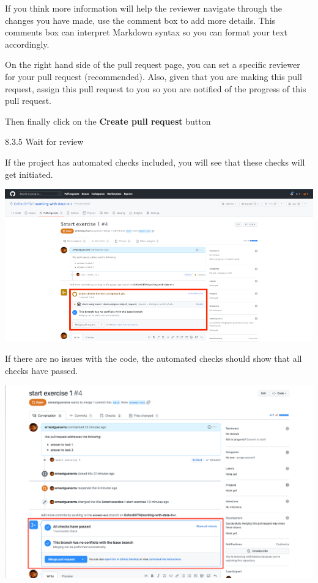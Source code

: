 \documentclass[
  12pt,
]{book}
\begin{document}
If you think more information will help the reviewer navigate through the changes you have made, use the comment box to add more details. This comments box can interpret Markdown syntax so you can format your text accordingly.

On the right hand side of the pull request page, you can set a specific reviewer for your pull request (recommended). Also, given that you are making this pull request, assign this pull request to you so you are notified of the progress of this pull request.

Then finally click on the \textbf{Create pull request} button

8.3.5 Wait for review

If the project has automated checks included, you will see that these checks will get initiated.

\includegraphics{images/pull_request5.png}

If there are no issues with the code, the automated checks should show that all checks have passed.

\includegraphics{images/pull_request6.png}
\end{document}
